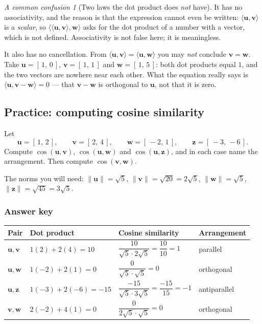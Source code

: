\documentclass[11pt]{article}
\theoremstyle{definition}
\theoremstyle{remark}
\newtheorem*{warn}{A common confusion}
\newcommand{\vc}[1]{\mathbf{#1}}
\newcommand{\norm}[1]{\lVert #1\rVert}
\begin{document}
\begin{warn}[Two laws the dot product does \emph{not} have]
It has no associativity, and the reason is that the expression cannot even be
written: $\langle\vc{u},\vc{v}\rangle$ is a \emph{scalar}, so
$\bigl\langle\langle\vc{u},\vc{v}\rangle,\vc{w}\bigr\rangle$ asks for the dot
product of a number with a vector, which is not defined. Associativity is not
false here; it is meaningless.

It also has no cancellation. From $\langle\vc{u},\vc{v}\rangle
=\langle\vc{u},\vc{w}\rangle$ you may \emph{not} conclude $\vc{v}=\vc{w}$. Take
$\vc{u}=[\,1,\,0\,]$, $\vc{v}=[\,1,\,1\,]$ and $\vc{w}=[\,1,\,5\,]$: both dot
products equal $1$, and the two vectors are nowhere near each other. What the
equation really says is
$\langle\vc{u},\vc{v}-\vc{w}\rangle=0$ --- that $\vc{v}-\vc{w}$ is orthogonal to
$\vc{u}$, not that it is zero.
\end{warn}

\subsection{Practice: computing cosine similarity}
Let
\[
  \vc{u}=[\,1,\,2\,],
  \qquad
  \vc{v}=[\,2,\,4\,],
  \qquad
  \vc{w}=[\,-2,\,1\,],
  \qquad
  \vc{z}=[\,-3,\,-6\,].
\]
Compute $\cos(\vc{u},\vc{v})$, $\cos(\vc{u},\vc{w})$ and $\cos(\vc{u},\vc{z})$,
and in each case name the arrangement. Then compute $\cos(\vc{v},\vc{w})$.

\medskip
\noindent The norms you will need:
$\norm{\vc{u}}=\sqrt5$, $\norm{\vc{v}}=\sqrt{20}=2\sqrt5$,
$\norm{\vc{w}}=\sqrt5$, $\norm{\vc{z}}=\sqrt{45}=3\sqrt5$.

\subsubsection*{Answer key}
\begin{center}
\renewcommand{\arraystretch}{2.1}   %
\begin{tabular}{@{}l l l l@{}}
\toprule
\textbf{Pair} & \textbf{Dot product} & \textbf{Cosine similarity} & \textbf{Arrangement} \\
\midrule
$\vc{u},\vc{v}$
  & $1(2)+2(4)=10$
  & $\dfrac{10}{\sqrt5\cdot 2\sqrt5}=\dfrac{10}{10}=1$
  & parallel \\
$\vc{u},\vc{w}$
  & $1(-2)+2(1)=0$
  & $\dfrac{0}{\sqrt5\cdot\sqrt5}=0$
  & orthogonal \\
$\vc{u},\vc{z}$
  & $1(-3)+2(-6)=-15$
  & $\dfrac{-15}{\sqrt5\cdot 3\sqrt5}=\dfrac{-15}{15}=-1$
  & antiparallel \\
\midrule
$\vc{v},\vc{w}$
  & $2(-2)+4(1)=0$
  & $\dfrac{0}{2\sqrt5\cdot\sqrt5}=0$
  & orthogonal \\
\bottomrule
\end{tabular}
\end{center}
\end{document}
